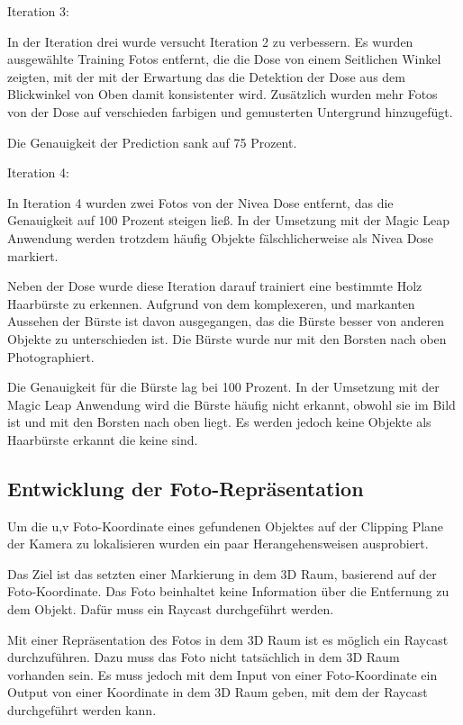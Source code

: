 \documentclass[german,a4paper, 12pt]{llncs}
\begin{document}
Iteration 3:

In der Iteration drei wurde versucht Iteration 2 zu verbessern. Es wurden ausgewählte Training Fotos entfernt, die die Dose von einem Seitlichen Winkel zeigten, mit der mit der Erwartung das die Detektion der Dose aus dem Blickwinkel von Oben damit konsistenter wird. Zusätzlich wurden mehr Fotos von der Dose auf verschieden farbigen und gemusterten Untergrund hinzugefügt. 

Die Genauigkeit der Prediction sank auf 75 Prozent.

Iteration 4:

In Iteration 4 wurden zwei Fotos von der Nivea Dose entfernt, das die Genauigkeit auf 100 Prozent steigen ließ. In der Umsetzung mit der Magic Leap Anwendung werden trotzdem häufig Objekte fälschlicherweise als Nivea Dose markiert.

Neben der Dose wurde diese Iteration darauf trainiert eine bestimmte Holz Haarbürste zu erkennen. Aufgrund von dem komplexeren, und markanten Aussehen der Bürste ist davon ausgegangen, das die Bürste besser von anderen Objekte zu unterschieden ist. 
Die Bürste wurde nur mit den Borsten nach oben Photographiert.

Die Genauigkeit für die Bürste lag bei 100 Prozent. 
In der Umsetzung mit der Magic Leap Anwendung wird die Bürste häufig nicht erkannt, obwohl sie im Bild ist und mit den Borsten nach oben liegt. Es werden jedoch keine Objekte als Haarbürste erkannt die keine sind.

\subsection{Entwicklung der Foto-Repräsentation}
\label{section:devpixeltoworld}

Um die u,v Foto-Koordinate eines gefundenen Objektes auf der Clipping Plane der Kamera zu lokalisieren wurden ein paar Herangehensweisen ausprobiert.

Das Ziel ist das setzten einer Markierung in dem 3D Raum, basierend auf der Foto-Koordinate. Das Foto beinhaltet keine Information über die Entfernung zu dem Objekt. Dafür muss ein Raycast durchgeführt werden. 

Mit einer Repräsentation des Fotos in dem 3D Raum ist es möglich ein Raycast durchzuführen. 
Dazu muss das Foto nicht tatsächlich in dem 3D Raum vorhanden sein. Es muss jedoch mit dem Input von einer Foto-Koordinate ein Output von einer Koordinate in dem 3D Raum geben, mit dem der Raycast durchgeführt werden kann.
\end{document}
